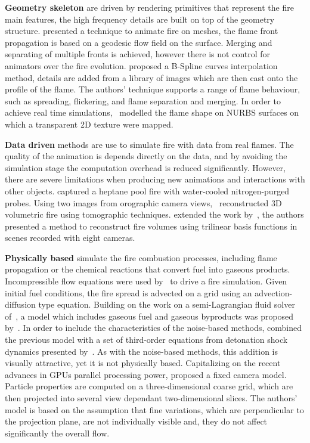 \textbf{Geometry skeleton} are driven by rendering primitives that represent the fire main features, the high frequency details are built on top of the geometry structure.
\cite{Lee:2001} presented a technique to animate fire on meshes, the flame front propagation is based on a geodesic flow field on the surface.
Merging and separating of multiple fronts is achieved, however there is not control for animators over the fire evolution. 
\cite{Lamorlette:2002} proposed a B-Spline curves interpolation method, details are added from a library of images which are then cast onto the profile of the flame.
The authors' technique supports a range of flame behaviour, such as spreading, flickering, and flame separation and merging.
In order to achieve real time simulations,~\cite{Bridault:2006} modelled the flame shape on NURBS surfaces on which a transparent 2D texture were mapped.

\textbf{Data driven} methods are use to simulate fire with data from real flames.
The quality of the animation is depends directly on the data, and by avoiding the simulation stage the computation overhead is reduced significantly.
However, there are severe limitations when producing new animations and interactions with other objects.
\cite{Rushmeier:1995} captured a heptane pool fire with water-cooled nitrogen-purged probes.
Using two images from orographic camera views,~\cite{Hasinoff:2003} reconstructed 3D volumetric fire using tomographic techniques.
\cite{Ihrke:2004} extended the work by~\cite{Hasinoff:2003}, the authors presented a method to reconstruct fire volumes using trilinear basis functions in scenes recorded with eight cameras.

\textbf{Physically based} simulate the fire combustion processes, including flame propagation or the chemical reactions that convert fuel into gaseous products.  
Incompressible flow equations were used by~\cite{Stam:1995} to drive a fire simulation.
Given initial fuel conditions, the fire spread is advected on a grid using an advection-diffusion type equation.
Building on the work on a semi-Lagrangian fluid solver of~\cite{Stam:1999}, a model which includes gaseous fuel and gaseous byproducts was proposed by~\cite{Nguyen:2002}.
In order to include the characteristics of the noise-based methods, \cite{Hong:2007} combined the previous model with a set of third-order equations from detonation shock dynamics presented by~\cite{Yao:1996}.
As with the noise-based methods, this addition is visually attractive, yet it is not physically based. 
Capitalizing on the recent advances in GPUs parallel processing power, \cite{Horvath:2009} proposed a fixed camera model.
Particle properties are computed on a three-dimensional coarse grid, which are then projected into several view dependant two-dimensional slices.
The authors' model is based on the assumption that fine variations, which are perpendicular to the projection plane, are not individually visible and, they do not affect significantly the overall flow.
 
